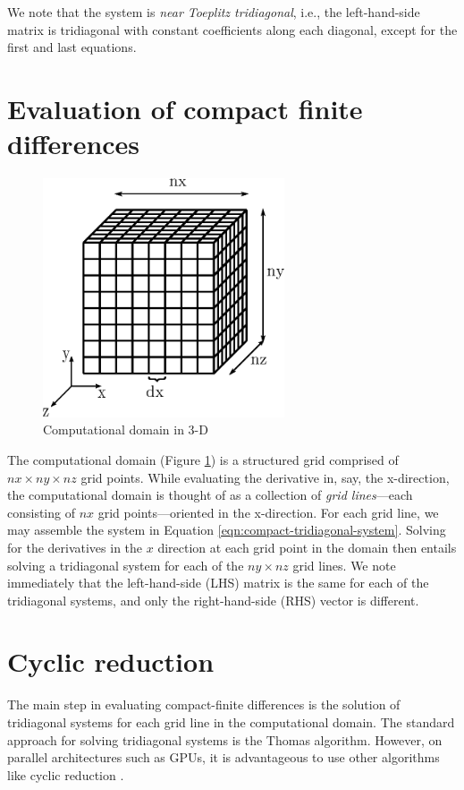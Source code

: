 \documentclass{elsarticle}
\begin{document}
We note that the system is \emph{near Toeplitz tridiagonal},
i.e., the left-hand-side matrix is tridiagonal with
constant coefficients along each diagonal,
except for the first and last equations.

\section{Evaluation of compact finite differences}

\begin{figure}[h!]
\begin{center}
\includegraphics[height=200pt]{img/computational-domain.eps}
\end{center}
\caption{Computational domain in 3-D}
\label{fig:computational-domain}
\end{figure}

The computational domain (Figure \ref{fig:computational-domain})
is a structured grid comprised of $nx \times ny \times nz$ grid points.
While evaluating the derivative in, say, the x-direction,
the computational domain is thought of as
a collection of \emph{grid lines}---each consisting of
$nx$ grid points---oriented in the x-direction.
For each grid line, we may assemble the system in
Equation \ref{eqn:compact-tridiagonal-system}.
Solving for the derivatives in the $x$ direction
at each grid point in the domain then entails
solving a tridiagonal system for each of the $ny \times nz$ grid lines.
We note immediately that the left-hand-side (LHS) matrix
is the same for each of the tridiagonal systems,
and only the right-hand-side (RHS) vector is different.


\section{Cyclic reduction}

The main step in evaluating compact-finite differences is the
solution of tridiagonal systems
for each grid line in the computational domain.
The standard approach for solving tridiagonal systems is
the Thomas algorithm.
However, on parallel architectures such as GPUs,
it is advantageous to use other algorithms like
cyclic reduction \cite{Zhang2010FTS}.
\end{document}
